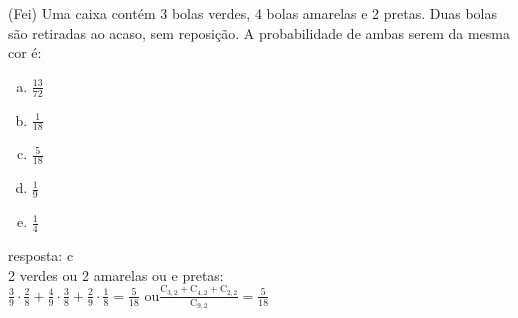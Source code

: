 \begin{ex}
 (Fei) Uma caixa contém 3 bolas verdes, 4 bolas amarelas e 2 pretas. Duas bolas são retiradas ao acaso, sem reposição. A probabilidade de ambas serem da mesma cor é:
    \begin{enumerate}[(a)]
    \item $\frac{13}{72}$
    \item $\frac{1}{18}$
    \item $\frac{5}{18}$
    \item $\frac{1}{9}$
    \item $\frac{1}{4}$
    \end{enumerate}
       \begin{sol}
        resposta: c \\
        2 verdes ou 2 amarelas ou e pretas: \\
        $\frac{3}{9}\cdot\frac{2}{8}+\frac{4}{9}\cdot\frac{3}{8}+\frac{2}{9}\cdot\frac{1}{8}=\frac{5}{18}$ \hspace{0,4cm}ou\hspace{0,4cm}$\frac{\mathrm{C}_{3,2}+\mathrm{C}_{4,2}+\mathrm{C}_{2,2}}{\mathrm{C}_{9,2}}=\frac{5}{18}$ 
       \end{sol}
\end{ex}